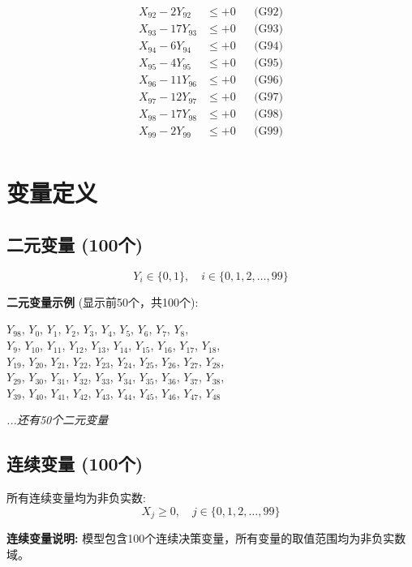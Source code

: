 \documentclass[a4paper,10pt]{article}
\begin{document}
{\begin{align}
X_{92} - 2Y_{92} &\leq +0 && \text{(G92)} \\
X_{93} - 17Y_{93} &\leq +0 && \text{(G93)} \\
X_{94} - 6Y_{94} &\leq +0 && \text{(G94)} \\
X_{95} - 4Y_{95} &\leq +0 && \text{(G95)} \\
X_{96} - 11Y_{96} &\leq +0 && \text{(G96)} \\
X_{97} - 12Y_{97} &\leq +0 && \text{(G97)} \\
X_{98} - 17Y_{98} &\leq +0 && \text{(G98)} \\
X_{99} - 2Y_{99} &\leq +0 && \text{(G99)} \\
\end{align}
}

\section{变量定义}

\subsection{二元变量 (100个)}

\begin{equation}
Y_i \in \{0,1\}, \quad i \in \{0, 1, 2, \ldots, 99\}
\end{equation}

\textbf{二元变量示例} (显示前50个，共100个):

{\small
$Y_{98}$, $Y_{0}$, $Y_{1}$, $Y_{2}$, $Y_{3}$, $Y_{4}$, $Y_{5}$, $Y_{6}$, $Y_{7}$, $Y_{8}$, \\
$Y_{9}$, $Y_{10}$, $Y_{11}$, $Y_{12}$, $Y_{13}$, $Y_{14}$, $Y_{15}$, $Y_{16}$, $Y_{17}$, $Y_{18}$, \\
$Y_{19}$, $Y_{20}$, $Y_{21}$, $Y_{22}$, $Y_{23}$, $Y_{24}$, $Y_{25}$, $Y_{26}$, $Y_{27}$, $Y_{28}$, \\
$Y_{29}$, $Y_{30}$, $Y_{31}$, $Y_{32}$, $Y_{33}$, $Y_{34}$, $Y_{35}$, $Y_{36}$, $Y_{37}$, $Y_{38}$, \\
$Y_{39}$, $Y_{40}$, $Y_{41}$, $Y_{42}$, $Y_{43}$, $Y_{44}$, $Y_{45}$, $Y_{46}$, $Y_{47}$, $Y_{48}$

\textit{...还有50个二元变量}
}

\subsection{连续变量 (100个)}

所有连续变量均为非负实数:
\begin{equation}
X_j \geq 0, \quad j \in \{0, 1, 2, \ldots, 99\}
\end{equation}

\textbf{连续变量说明:} 模型包含100个连续决策变量，所有变量的取值范围均为非负实数域。
\end{document}
